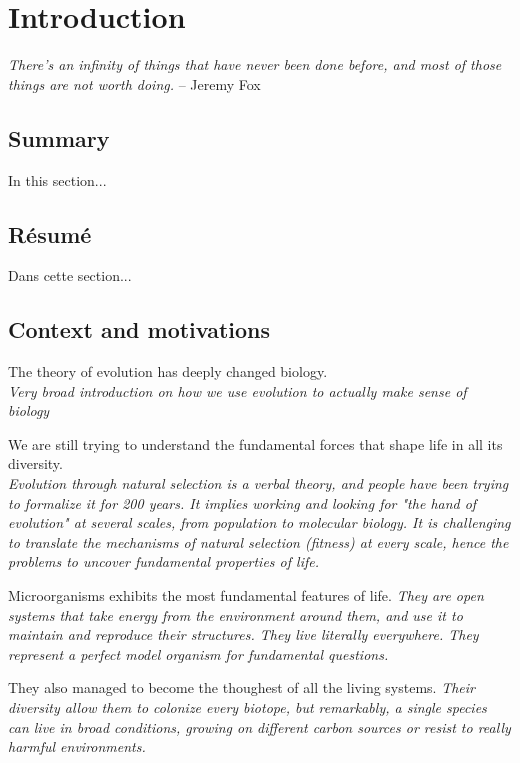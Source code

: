 \chapter{Introduction}

\textit{There's an infinity of things that have never been done before, and
most of those things are not worth doing.} -- Jeremy Fox

\section*{Summary}

In this section...

\section*{Résumé}

Dans cette section...

\section{Context and motivations}

The theory of evolution has deeply changed biology.\\
\textit{Very broad introduction on how we use evolution to actually make sense of biology}

We are still trying to understand the fundamental forces that shape life in all its diversity.\\
\textit{Evolution through natural selection is a verbal theory, and people have been trying to formalize it for 200 years.
It implies working and looking for "the hand of evolution" at several scales, from population to molecular biology.
It is challenging to translate the mechanisms of natural selection (fitness) at every scale, hence the problems to uncover fundamental properties of life.}

Microorganisms exhibits the most fundamental features of life. 
\textit{They are open systems that take energy from the environment around them, and use it to maintain and reproduce their structures.
They live literally everywhere. They represent a perfect model organism for fundamental questions.}

They also managed to become the thoughest of all the living systems.
\textit{Their diversity allow them to colonize every biotope, but remarkably, a single species can live in broad conditions, growing on different carbon sources or resist to really harmful environments.}

